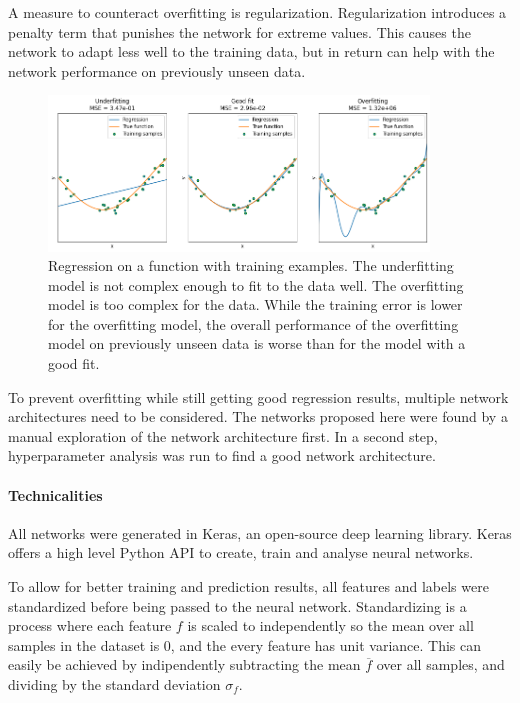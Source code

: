 A measure to counteract overfitting is regularization.
Regularization introduces a penalty term that punishes the network for extreme values.
This causes the network to adapt less well to the training data, but in return can help with the network
performance on previously unseen data.

\begin{figure} [h]
    \centering
    \includegraphics[width=0.9\textwidth]{figures/regression/overfitting.png} 
    \caption{Regression on a function with training examples. 
            The underfitting model is not complex enough to fit to the data well. 
            The overfitting model is too complex for the data.
            While the training error is lower for the overfitting model, 
            the overall performance of the overfitting model on previously unseen data 
            is worse than for the model with a good fit.
        }
    \label{fig:overfitting}
\end{figure}
  
To prevent overfitting while still getting good regression results, multiple network architectures need to be considered.
The networks proposed here were found by a manual exploration of the network architecture first.
In a second step, hyperparameter analysis was run to find a good network architecture.

\paragraph{Technicalities}

All networks were generated in Keras, an open-source deep learning library.
Keras offers a high level Python API to create, train and analyse neural networks.

To allow for better training and prediction results, all features and labels were standardized before being passed to the neural network.
Standardizing is a process where each feature $f$ is scaled to independently so the mean over all samples in the dataset is 0, 
and the every feature has unit variance.
This can easily be achieved by indipendently subtracting the mean $\overline{f}$ over all samples, and dividing by the standard deviation $\sigma_f$.

